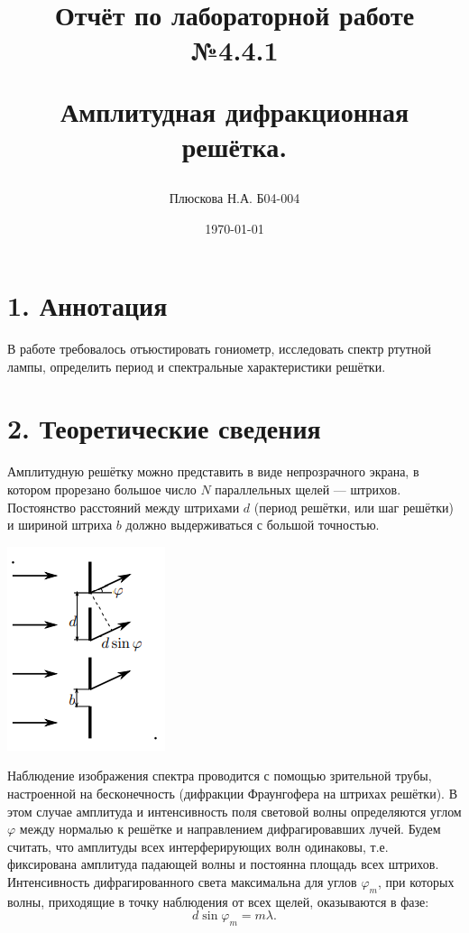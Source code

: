 \documentclass[a4paper,12pt]{report}
\title{Отчёт по лабораторной работе №4.4.1 

Амплитудная дифракционная решётка.}
\author{Плюскова Н.А. Б04-004 }
\date{\today}
\begin{document}
\maketitle

\section*{1. Аннотация}

В работе требовалось отъюстировать гониометр, исследовать
спектр ртутной лампы, определить период и спектральные характеристики решётки.

\section*{2. Теоретические сведения}

Амплитудную решётку можно представить в виде непрозрачного экрана, в котором прорезано большое число $N$ параллельных щелей — штрихов. Постоянство расстояний между штрихами $d$ (период решётки, или шаг решётки) и шириной штриха $b$ должно выдерживаться с большой точностью.

\begin{center}
    \includegraphics[scale = 1]{pic1.PNG}
\end{center}

Наблюдение изображения спектра проводится с помощью зрительной трубы, настроенной на бесконечность (дифракции Фраунгофера на штрихах решётки). В этом случае амплитуда и интенсивность поля световой волны определяются углом $\varphi$ между нормалью к решётке и направлением дифрагировавших лучей. Будем считать, что амплитуды всех интерферирующих волн одинаковы, т.е. фиксирована амплитуда падающей волны и постоянна площадь всех штрихов. Интенсивность дифрагированного света максимальна для углов $\varphi_{m}$, при которых волны, приходящие в точку наблюдения от всех щелей, оказываются в фазе:
\begin{equation}
    d\sin{\varphi_{m}} = m\lambda.
\end{equation}
\end{document}
